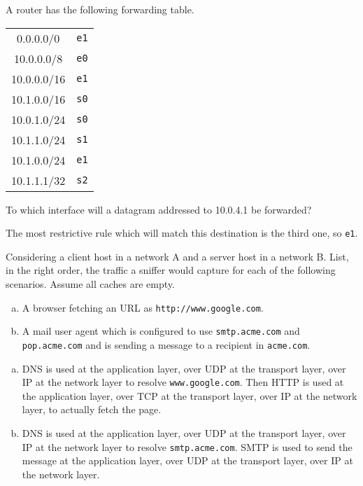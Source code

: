 \begin{Exercise}
A router has the following forwarding table.
\begin{center}
\begin{tabular}{c|c}
0.0.0.0/0 & \texttt{e1} \\
10.0.0.0/8 & \texttt{e0} \\
10.0.0.0/16 & \texttt{e1} \\
10.1.0.0/16 & \texttt{s0} \\
10.0.1.0/24 & \texttt{s0} \\
10.1.1.0/24 & \texttt{s1} \\
10.1.0.0/24 & \texttt{e1} \\
10.1.1.1/32 & \texttt{s2}
\end{tabular}
\end{center}

To which interface will a datagram addressed to 10.0.4.1 be forwarded?
\end{Exercise}
\begin{Answer}
The most restrictive rule which will match this destination is the third one, so \texttt{e1}.
\end{Answer}

\begin{Exercise}
Considering a client host in a network A and a server host in a network B. List, in the right order, the traffic a sniffer would capture for each of the following scenarios.
Assume all caches are empty.
\begin{enumerate}[a)]
\item A browser fetching an URL as \texttt{http://www.google.com}.
\item A mail user agent which is configured to use \texttt{smtp.acme.com} and \texttt{pop.acme.com} and is sending a message to a recipient in \texttt{acme.com}.
\end{enumerate}
\end{Exercise}
\begin{Answer}
\begin{enumerate}[a)]
\item DNS is used at the application layer, over UDP at the transport layer, over IP at the network layer to resolve \texttt{www.google.com}.
Then HTTP is used at the application layer, over TCP at the transport layer, over IP at the network layer, to actually fetch the page.
\item DNS is used at the application layer, over UDP at the transport layer, over IP at the network layer to resolve \texttt{smtp.acme.com}.
SMTP is used to send the message at the application layer, over UDP at the transport layer, over IP at the network layer.
\end{enumerate}
\end{Answer}

